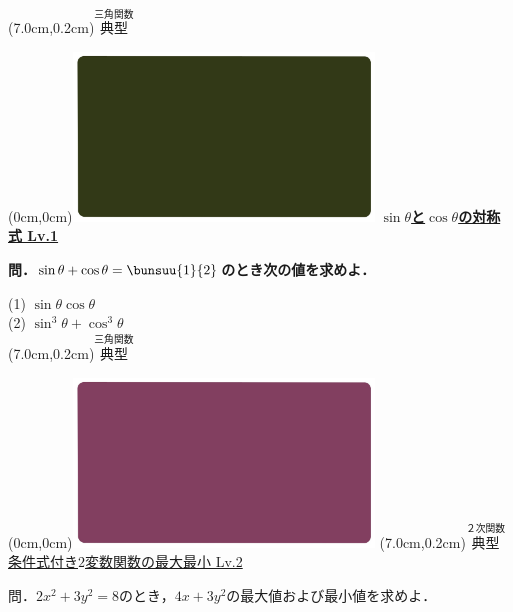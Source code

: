 \documentclass[10pt,
fleqn,
dvipdfmx,
uplatex
]{jsarticle}
\begin{document}
\at(7.0cm,0.2cm){\small\color{bradorange}$\overset{\text{三角関数}}{\text{典型}}$}

\newpage

\at(0cm,0cm){\includegraphics[width=8cm,bb=0 0 1920 1080]{./youtube/thumbnails/templates/smart_background/三角関数.jpeg}}
{\color{orange}\bf\boldmath\Large\underline{$\sin \theta$と$\cos \theta$の対称式 Lv.1}}\vspace{0.3zw}

\normalsize
\bf\boldmath 問．$\sin \theta +\cos \theta =\bunsuu{1}{2}$のとき次の値を求めよ．

\huge
\vspace{0.2zw}
(1)  $\sin \theta \cos \theta$\\
(2)  $\sin ^3\theta +\cos ^3\theta$\\

\at(7.0cm,0.2cm){\small\color{bradorange}$\overset{\text{三角関数}}{\text{典型}}$}

\newpage



\at(0cm,0cm){\includegraphics[width=8cm,bb=0 0 1920 1080]{./youtube/thumbnails/templates/smart_background/２次関数.jpeg}}
\at(7.0cm,0.2cm){\small\color{bradorange}$\overset{\text{２次関数}}{\text{典型}}$}
{\color{orange}\normalsize\underline{条件式付き$2$変数関数の最大最小 Lv.2 }}\vspace{0.3zw}

\LARGE 
問．$2x^2+3y^2=8$のとき，$4x+3y^2$の最大値および最小値を求めよ．


\newpage
\end{document}
